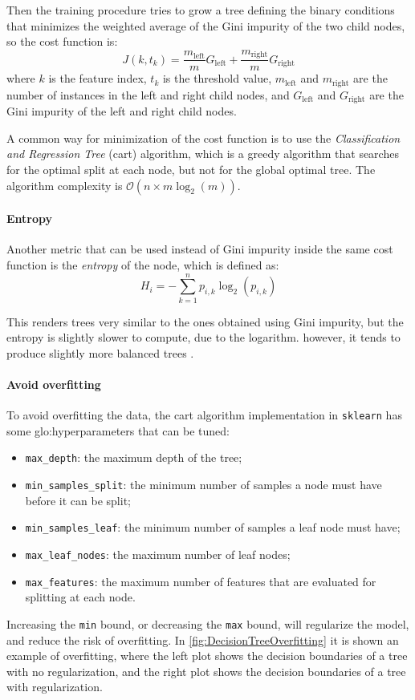 Then the training procedure tries to grow a tree defining the binary conditions that minimizes the weighted average of the Gini impurity of the two child nodes, so the cost function is:
\begin{equation}
    J(k, t_k) = \frac{m_{\text{left}}}{m}G_{\text{left}} + \frac{m_{\text{right}}}{m}G_{\text{right}}
\end{equation}
where $k$ is the feature index, $t_k$ is the threshold value, $m_{\text{left}}$ and $m_{\text{right}}$ are the number of instances in the left and right child nodes, and $G_{\text{left}}$ and $G_{\text{right}}$ are the Gini impurity of the left and right child nodes.

A common way for minimization of the cost function is to use the \emph{Classification and Regression Tree} (\gls{cart}) algorithm, which is a greedy algorithm that searches for the optimal split at each node, but not for the global optimal tree. The algorithm complexity is $\mathcal{O}(n \times m \log_2(m))$.

\paragraph{Entropy}
Another metric that can be used instead of Gini impurity inside the same cost function is the \emph{entropy} of the node, which is defined as:
\begin{equation}
    H_i = - \sum_{k=1}^{n}p_{i,k}\log_2(p_{i,k})
\end{equation}

This renders trees very similar to the ones obtained using Gini impurity, but the entropy is slightly slower to compute, due to the logarithm. however, it tends to produce slightly more balanced trees \cite{raschka2013decisiontrees}.

\paragraph{Avoid overfitting}
To avoid overfitting the data, the \gls{cart} algorithm implementation in \texttt{sklearn} has some \gls{glo:hyperparameter}s that can be tuned:
\begin{itemize}
    \item \texttt{max\_depth}: the maximum depth of the tree;
    \item \texttt{min\_samples\_split}: the minimum number of samples a node must have before it can be split;
    \item \texttt{min\_samples\_leaf}: the minimum number of samples a leaf node must have;
    \item \texttt{max\_leaf\_nodes}: the maximum number of leaf nodes;
    \item \texttt{max\_features}: the maximum number of features that are evaluated for splitting at each node.
\end{itemize}
Increasing the \texttt{min} bound, or decreasing the \texttt{max} bound, will regularize the model, and reduce the risk of overfitting.
In \autoref{fig:DecisionTreeOverfitting} it is shown an example of overfitting, where the left plot shows the decision boundaries of a tree with no regularization, and the right plot shows the decision boundaries of a tree with regularization.

